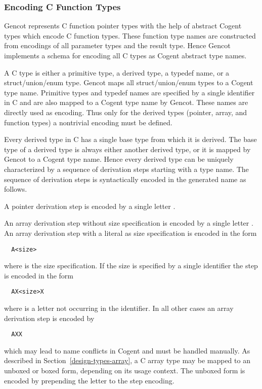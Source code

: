 \subsubsection{Encoding C Function Types}

Gencot represents C function pointer types with the help of abstract Cogent types which encode C function types. These
function type names are constructed from encodings of all parameter types and the result type. Hence Gencot implements
a schema for encoding all C types as Cogent abstract type names.

A C type is either a primitive type, a derived type, a typedef name, or a struct/union/enum type. Gencot maps all
struct/union/enum types to a Cogent type name. Primitive types and typedef names are specified by a single identifier
in C and are also mapped to a Cogent type name by Gencot. These names are directly used as encoding. Thus only for the 
derived types (pointer, array, and function types) a nontrivial encoding must be defined.

Every derived type in C has a single base type from which it is derived. The base type of a derived
type is always either another derived type, or it is mapped by Gencot to a Cogent type name. Hence every derived 
type can be uniquely characterized by a sequence of derivation steps starting with a type name. The sequence of 
derivation steps is syntactically encoded in the generated name as follows.

A pointer derivation step is encoded by a single letter . 

An array derivation step without size
specification is encoded by a single letter . An array derivation step with a literal
as size specification is encoded in the form
\begin{verbatim}
  A<size>
\end{verbatim}
where  is the size specification. If the size is specified by a single identifier the 
step is encoded in the form
\begin{verbatim}
  AX<size>X
\end{verbatim}
where  is a letter not occurring in the identifier.
In all other cases an array derivation step is encoded by
\begin{verbatim}
  AXX
\end{verbatim}
which may lead to name conflicts in Cogent and must be handled manually. As described in 
Section~\ref{design-types-array}, a C array type may be mapped to an unboxed or boxed form, depending
on its usage context. The unboxed form is encoded by prepending the letter  to the step
encoding.

